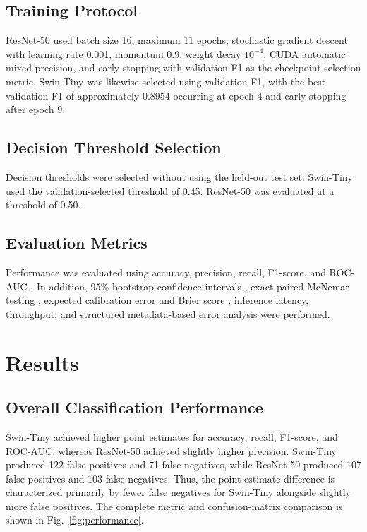 \documentclass[journal]{IEEEtran}
\begin{document}
\subsection{Training Protocol}
ResNet-50 used batch size 16, maximum 11 epochs, stochastic gradient descent with learning rate 0.001, momentum 0.9, weight decay $10^{-4}$, CUDA automatic mixed precision, and early stopping with validation F1 as the checkpoint-selection metric. Swin-Tiny was likewise selected using validation F1, with the best validation F1 of approximately 0.8954 occurring at epoch 4 and early stopping after epoch 9.

\subsection{Decision Threshold Selection}
Decision thresholds were selected without using the held-out test set. Swin-Tiny used the validation-selected threshold of 0.45. ResNet-50 was evaluated at a threshold of 0.50.

\subsection{Evaluation Metrics}
Performance was evaluated using accuracy, precision, recall, F1-score, and ROC-AUC \cite{fawcett2006roc}. In addition, 95\% bootstrap confidence intervals \cite{efron1993bootstrap}, exact paired McNemar testing \cite{dietterich1998tests}, expected calibration error and Brier score \cite{guo2017calibration}, inference latency, throughput, and structured metadata-based error analysis were performed.

\section{Results}
\subsection{Overall Classification Performance}
Swin-Tiny achieved higher point estimates for accuracy, recall, F1-score, and ROC-AUC, whereas ResNet-50 achieved slightly higher precision. Swin-Tiny produced 122 false positives and 71 false negatives, while ResNet-50 produced 107 false positives and 103 false negatives. Thus, the point-estimate difference is characterized primarily by fewer false negatives for Swin-Tiny alongside slightly more false positives. The complete metric and confusion-matrix comparison is shown in Fig.~\ref{fig:performance}.
\end{document}
